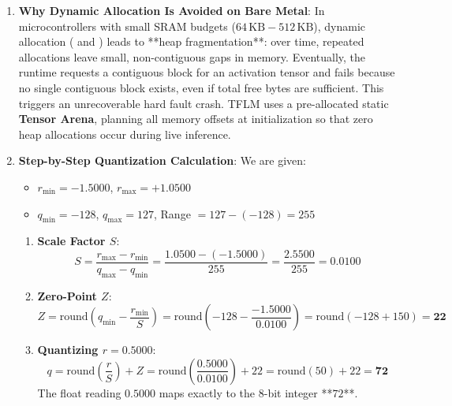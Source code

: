 \begin{enumerate}
    \item \textbf{Why Dynamic Allocation Is Avoided on Bare Metal}:
    In microcontrollers with small SRAM budgets ($64\,\text{KB} - 512\,\text{KB}$), dynamic allocation ( and ) leads to **heap fragmentation**: over time, repeated allocations leave small, non-contiguous gaps in memory. Eventually, the runtime requests a contiguous block for an activation tensor and fails because no single contiguous block exists, even if total free bytes are sufficient. This triggers an unrecoverable hard fault crash. TFLM uses a pre-allocated static \textbf{Tensor Arena}, planning all memory offsets at initialization so that zero heap allocations occur during live inference.

    \item \textbf{Step-by-Step Quantization Calculation}:
    We are given:
    \begin{itemize}
        \item $r_{\min} = -1.5000$, $r_{\max} = +1.0500$
        \item $q_{\min} = -128$, $q_{\max} = 127$, Range $= 127 - (-128) = 255$
    \end{itemize}
    \begin{enumerate}
        \item \textbf{Scale Factor $S$}:
        \begin{equation*}
        S = \frac{r_{\max} - r_{\min}}{q_{\max} - q_{\min}} = \frac{1.0500 - (-1.5000)}{255} = \frac{2.5500}{255} = \mathbf{0.0100}
        \end{equation*}
        \item \textbf{Zero-Point $Z$}:
        \begin{equation*}
        Z = \text{round}\left( q_{\min} - \frac{r_{\min}}{S} \right) = \text{round}\left( -128 - \frac{-1.5000}{0.0100} \right) = \text{round}(-128 + 150) = \mathbf{22}
        \end{equation*}
        \item \textbf{Quantizing $r = 0.5000$}:
        \begin{equation*}
        q = \text{round}\left( \frac{r}{S} \right) + Z = \text{round}\left( \frac{0.5000}{0.0100} \right) + 22 = \text{round}(50) + 22 = \mathbf{72}
        \end{equation*}
        The float reading $0.5000$ maps exactly to the 8-bit integer **$72$**.
    \end{enumerate}


\end{enumerate}
